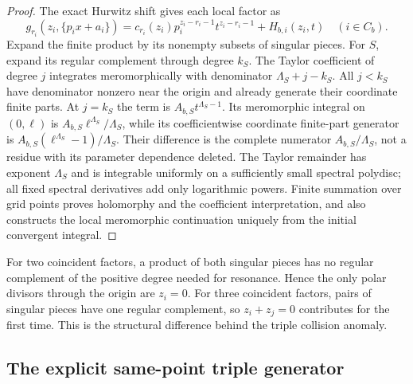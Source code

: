 \documentclass[11pt,a4paper]{article}
\numberwithin{equation}{section}
\theoremstyle{definition}
\theoremstyle{remark}
\begin{document}
\begin{proof}
The exact Hurwitz shift gives each local factor as
\[
 g_{r_i}(z_i,\{p_ix+a_i\})
 =c_{r_i}(z_i)p_i^{z_i-r_i-1}t^{z_i-r_i-1}
       +H_{b,i}(z_i,t)\quad(i\in C_b).
\]
Expand the finite product by its nonempty subsets of singular pieces.
For $S$, expand its regular complement through degree $k_S$. The
Taylor coefficient of degree $j$ integrates meromorphically with
denominator $\Lambda_S+j-k_S$. All $j<k_S$ have denominator nonzero
near the origin and already generate their coordinate finite parts.
At $j=k_S$ the term is $A_{b,S}t^{\Lambda_S-1}$.
Its meromorphic integral on $(0,\ell)$ is
$A_{b,S}\ell^{\Lambda_S}/\Lambda_S$, while its coefficientwise
coordinate finite-part generator is
$A_{b,S}(\ell^{\Lambda_S}-1)/\Lambda_S$. Their difference is the
complete numerator $A_{b,S}/\Lambda_S$, not a residue with its
parameter dependence deleted. The Taylor remainder has exponent
$\Lambda_S$ and is integrable uniformly on a sufficiently small
spectral polydisc; all fixed spectral derivatives add only logarithmic
powers. Finite summation over grid points proves holomorphy and the
coefficient interpretation, and also constructs the local meromorphic
continuation uniquely from the initial convergent integral.
\end{proof}

For two coincident factors, a product of both singular pieces has no
regular complement of the positive degree needed for resonance. Hence
the only polar divisors through the origin are $z_i=0$. For three
coincident factors, pairs of singular pieces have one regular
complement, so $z_i+z_j=0$ contributes for the first time. This is the
structural difference behind the triple collision anomaly.

\subsection{The explicit same-point triple generator}
\label{cl:triple}
\end{document}
